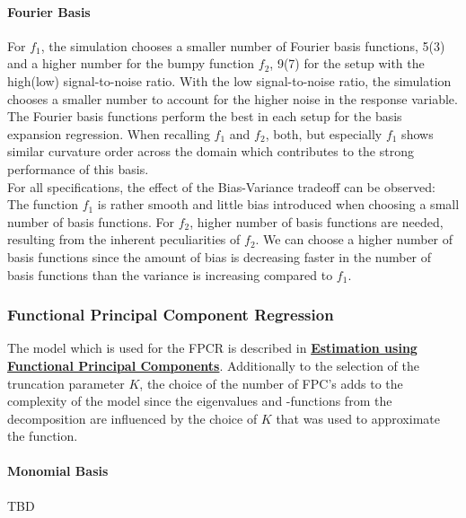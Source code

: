 \documentclass[11pt,twoside,a4paper]{article}
\begin{document}
	\paragraph{Fourier Basis}
	For $f_1$, the simulation chooses a smaller number of Fourier basis functions, 5(3) and a higher number for the bumpy function $f_2$, 9(7) for the setup with the high(low) signal-to-noise ratio. With the low signal-to-noise ratio, the simulation chooses a smaller number to account for the higher noise in the response variable. The Fourier basis functions perform the best in each setup for the basis expansion regression. When recalling $f_1$ and $f_2$, both, but especially $f_1$ shows similar curvature order across the domain which contributes to the strong performance of this basis.	\\
	
	For all specifications, the effect of the Bias-Variance tradeoff can be observed: The function $f_1$ is rather smooth and little bias introduced when choosing a small number of basis functions. For $f_2$, higher number of basis functions are needed, resulting from the inherent peculiarities of $f_2$. We can choose a higher number of basis functions since the amount of bias is decreasing faster in the number of basis functions than the variance is increasing compared to $f_1$. 

	\subsubsection{Functional Principal Component Regression}
	The model which is used for the FPCR is described in \hyperref[fpc_exp_transf]{\textbf{Estimation using Functional Principal Components}}. Additionally to the selection of the truncation parameter $K$, the choice of the number of FPC's adds to the complexity of the model since the eigenvalues and -functions from the decomposition are influenced by the choice of $K$ that was used to approximate the function.
	
	\paragraph{Monomial Basis}
	TBD
\end{document}
